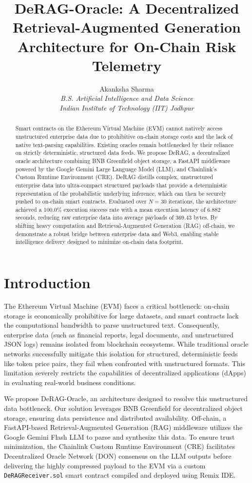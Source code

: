 \documentclass[11pt,a4paper]{article}
\title{\textbf{DeRAG-Oracle: A Decentralized Retrieval-Augmented Generation Architecture for On-Chain Risk Telemetry}}
\author{
    Akanksha Sharma \\
    \textit{B.S. Artificial Intelligence and Data Science} \\
    \textit{Indian Institute of Technology (IIT) Jodhpur} \\
}
\date{}
\begin{document}
\maketitle

\begin{abstract}
Smart contracts on the Ethereum Virtual Machine (EVM) cannot natively access unstructured enterprise data due to prohibitive on-chain storage costs and the lack of native text-parsing capabilities. Existing oracles remain bottlenecked by their reliance on strictly deterministic, structured data feeds. We propose DeRAG, a decentralized oracle architecture combining BNB Greenfield object storage, a FastAPI middleware powered by the Google Gemini Large Language Model (LLM), and Chainlink's Custom Runtime Environment (CRE). DeRAG distills complex, unstructured enterprise data into ultra-compact structured payloads that provide a deterministic representation of the probabilistic underlying inference, which can then be securely pushed to on-chain smart contracts. Evaluated over $N=30$ iterations, the architecture achieved a 100.0\% execution success rate with a mean execution latency of 6.882 seconds, reducing raw enterprise data into average payloads of 369.43 bytes. By shifting heavy computation and Retrieval-Augmented Generation (RAG) off-chain, we demonstrate a robust bridge between enterprise data and Web3, enabling stable intelligence delivery designed to minimize on-chain data footprint.
\end{abstract}

\section{Introduction}
The Ethereum Virtual Machine (EVM) faces a critical bottleneck: on-chain storage is economically prohibitive for large datasets, and smart contracts lack the computational bandwidth to parse unstructured text. Consequently, enterprise data (such as financial reports, legal documents, and unstructured JSON logs) remains isolated from blockchain ecosystems. While traditional oracle networks successfully mitigate this isolation for structured, deterministic feeds like token price pairs, they fail when confronted with unstructured formats. This limitation severely restricts the capabilities of decentralized applications (dApps) in evaluating real-world business conditions.

We propose DeRAG-Oracle, an architecture designed to resolve this unstructured data bottleneck. Our solution leverages BNB Greenfield for decentralized object storage, ensuring data persistence and distributed availability. Off-chain, a FastAPI-based Retrieval-Augmented Generation (RAG) middleware utilizes the Google Gemini Flash LLM to parse and synthesize this data. To ensure trust minimization, the Chainlink Custom Runtime Environment (CRE) facilitates Decentralized Oracle Network (DON) consensus on the LLM outputs before delivering the highly compressed payload to the EVM via a custom \texttt{DeRAGReceiver.sol} smart contract compiled and deployed using Remix IDE.
\end{document}
